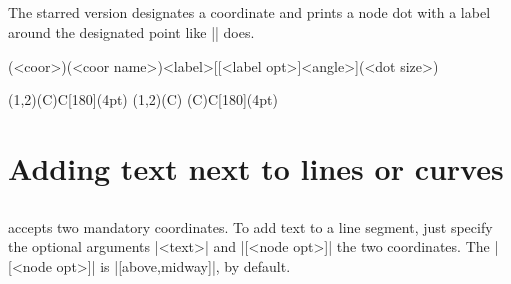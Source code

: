 \subsection{\protect\cmd{\tzcoor*}}
\label{ssi:tzcoor*}

The starred version \icmd{\tzcoor*} designates a coordinate and prints a node dot with a label around the designated point like |\tzdot*| does.

\begin{tzdef}
(<coor>)(<coor name>){<label>}[[<label opt>]<angle>](<dot size>)
\end{tzdef}

\begin{tzcode}{.3}
\end{tzcode}

\begin{tztikz}
\tzcoor*(1,2)(C){C}[180](4pt)  %
  \tzcoor(1,2)(C)
  \tzdot*(C){C}[180](4pt)
\end{tztikz}

\section{Adding text next to lines or curves}
\label{si:texttolines}

\subsection{\protect\cmd{\tzline}}
\label{ssi:texttotzline}

\icmd{\tzline} accepts two mandatory coordinates.
To add text to a line segment, just specify the optional arguments |{<text>}| and |[<node opt>]|  the two coordinates. The |[<node opt>]| is |[above,midway]|, by default.

\begin{tzcode}{.3}
\end{tzcode}

